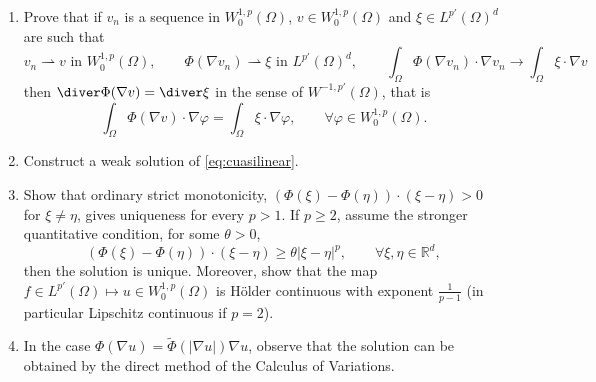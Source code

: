 \begin{example}
\begin{enumerate}
        \item  Prove that if $v_n$ is a sequence in $W_0^{1,p}(\Omega)$, $v \in W_0^{1,p}(\Omega)$ and $\xi \in L^{p'} (\Omega)^d$ are such that
              $$
                  v_n \rightharpoonup v \text{ in } W_0^{1,p} (\Omega), \qquad \Phi(\nabla v_n) \rightharpoonup \xi \text{ in } L^{p'} (\Omega)^d, \qquad \int_\Omega \Phi(\nabla v_n) \cdot \nabla v_n \to \int_\Omega \xi \cdot \nabla v
              $$
              then $\diver \Phi(\nabla v) = \diver \xi$ in the sense of $W^{-1,p'} (\Omega)$, that is
              $$
                  \int_\Omega \Phi(\nabla v) \cdot \nabla \varphi = \int_\Omega \xi \cdot \nabla \varphi, \qquad \forall \varphi \in W_0^{1,p} (\Omega).
              $$

        \item Construct a weak solution of \eqref{eq:cuasilinear}.

        \item Show that ordinary strict monotonicity,
              $(\Phi(\xi)-\Phi(\eta))\cdot(\xi-\eta)>0$ for $\xi\ne\eta$, gives uniqueness for every $p>1$.
              If $p\ge2$, assume the stronger quantitative condition, for some $\theta>0$,
              $$	(\Phi(\xi) - \Phi(\eta) ) \cdot (\xi - \eta) \ge \theta |\xi - \eta|^p , \qquad \forall \xi, \eta \in {\mathbb R^d}, $$
              then the solution is unique. Moreover, show that the map $f \in L^{p'} (\Omega) \mapsto u \in W_0^{1,p}(\Omega)$ is Hölder continuous with exponent $\frac{1}{p-1}$ (in particular Lipschitz continuous if $p = 2$).

        \item In the case  $\Phi(\nabla u) = \tilde\Phi(|\nabla u|) \nabla u$, observe that the solution can be obtained by the direct method of the Calculus of Variations.
    \end{enumerate}
\end{example}

